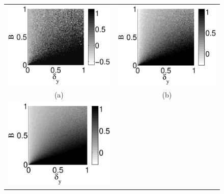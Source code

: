 \documentclass[twocolumn,aps,pre,groupedaddress]{revtex4-1}
\begin{document}
\begin{figure}[ht]
\begin{tabular}{cc}
\includegraphics[scale=0.38]{SimpleIRexample_diffLpart1.eps} &
\includegraphics[scale=0.38]{SimpleIRexample_diffLpart2.eps} \\
(a) & (b)\\
\includegraphics[scale=0.38]{SimpleIRexample_diffLpart3.eps} &

\end{tabular}
\end{figure}
\end{document}
